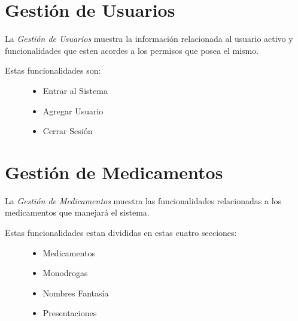 \documentclass[a4paper,10pt,spanish]{sphinxmanual}
\begin{document}
\section{Gestión de Usuarios}
\label{pantallaprincipal:gestion-de-usuarios}\label{pantallaprincipal:gestion-usuarios}
La \emph{Gestión de Usuarios} muestra la información relacionada al usuario activo y funcionalidades que esten acordes a los permisos que posea el mismo.

\begin{description}
\item[{Estas funcionalidades son:}] \leavevmode\begin{itemize}
\item {} 
Entrar al Sistema

\item {} 
Agregar Usuario

\item {} 
Cerrar Sesión

\end{itemize}

\end{description}


\section{Gestión de Medicamentos}
\label{pantallaprincipal:gestion-medicamentos}\label{pantallaprincipal:gestion-de-medicamentos}
La \emph{Gestión de Medicamentos} muestra las funcionalidades relacionadas a los medicamentos que manejará el sistema.

\begin{description}
\item[{Estas funcionalidades estan divididas en estas cuatro secciones:}] \leavevmode\begin{itemize}
\item {} 
Medicamentos

\item {} 
Monodrogas

\item {} 
Nombres Fantasía

\item {} 
Presentaciones

\end{itemize}

\end{description}
\end{document}

